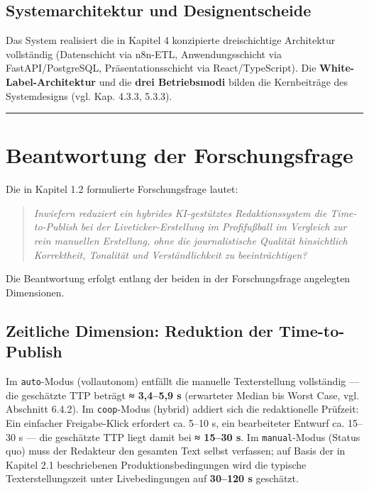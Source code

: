 \subsection{Systemarchitektur und
Designentscheide}\label{systemarchitektur-und-designentscheide}

Das System realisiert die in Kapitel 4 konzipierte dreischichtige
Architektur vollständig (Datenschicht via n8n-ETL, Anwendungsschicht via
FastAPI/PostgreSQL, Präsentationsschicht via React/TypeScript). Die
\textbf{White-Label-Architektur} und die \textbf{drei Betriebsmodi}
bilden die Kernbeiträge des Systemdesigns (vgl. Kap. 4.3.3, 5.3.3).

\begin{center}\rule{0.5\linewidth}{0.5pt}\end{center}

\section{Beantwortung der
Forschungsfrage}\label{beantwortung-der-forschungsfrage}

Die in Kapitel 1.2 formulierte Forschungsfrage lautet:

\begin{quote}
\emph{Inwiefern reduziert ein hybrides KI-gestütztes Redaktionssystem
die Time-to-Publish bei der Liveticker-Erstellung im Profifußball im
Vergleich zur rein manuellen Erstellung, ohne die journalistische
Qualität hinsichtlich Korrektheit, Tonalität und Verständlichkeit zu
beeinträchtigen?}
\end{quote}

Die Beantwortung erfolgt entlang der beiden in der Forschungsfrage
angelegten Dimensionen.

\subsection{Zeitliche Dimension: Reduktion der
Time-to-Publish}\label{zeitliche-dimension-reduktion-der-time-to-publish}

Im \texttt{auto}-Modus (vollautonom) entfällt die manuelle
Texterstellung vollständig --- die geschätzte TTP beträgt \textbf{≈
3,4--5,9 s} (erwarteter Median bis Worst Case, vgl. Abschnitt 6.4.2). Im
\texttt{coop}-Modus (hybrid) addiert sich die redaktionelle Prüfzeit:
Ein einfacher Freigabe-Klick erfordert ca. 5--10 s, ein bearbeiteter
Entwurf ca. 15--30 s --- die geschätzte TTP liegt damit bei \textbf{≈
15--30 s}. Im \texttt{manual}-Modus (Status quo) muss der Redakteur den
gesamten Text selbst verfassen; auf Basis der in Kapitel 2.1
beschriebenen Produktionsbedingungen wird die typische
Texterstellungszeit unter Livebedingungen auf \textbf{30--120 s}
geschätzt.

